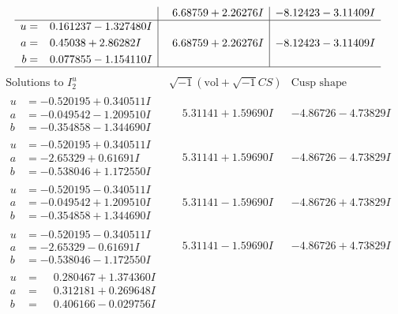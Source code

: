 \documentclass[1p]{elsarticle_modified}
\theoremstyle{definition}
\newcommand{\I}{\sqrt{-1}}
\begin{document}
$$\begin{array}{c|c|c}
 & \phantom{-}6.68759 + 2.26276 I & -8.12423 - 3.11409 I \\ \hline\begin{aligned}
u &= \phantom{-}0.161237 - 1.327480 I \\
a &= \phantom{-}0.45038 + 2.86282 I \\
b &= \phantom{-}0.077855 - 1.154110 I\end{aligned}
 & \phantom{-}6.68759 + 2.26276 I & -8.12423 - 3.11409 I\\
 \hline 
 \end{array}$$\newpage$$\begin{array}{c|c|c}  
\text{Solutions to }I^u_{2}& \I (\text{vol} + \sqrt{-1}CS) & \text{Cusp shape}\\
 \hline 
\begin{aligned}
u &= -0.520195 + 0.340511 I \\
a &= -0.049542 - 1.209510 I \\
b &= -0.354858 - 1.344690 I\end{aligned}
 & \phantom{-}5.31141 + 1.59690 I & -4.86726 - 4.73829 I \\ \hline\begin{aligned}
u &= -0.520195 + 0.340511 I \\
a &= -2.65329 + 0.61691 I \\
b &= -0.538046 + 1.172550 I\end{aligned}
 & \phantom{-}5.31141 + 1.59690 I & -4.86726 - 4.73829 I \\ \hline\begin{aligned}
u &= -0.520195 - 0.340511 I \\
a &= -0.049542 + 1.209510 I \\
b &= -0.354858 + 1.344690 I\end{aligned}
 & \phantom{-}5.31141 - 1.59690 I & -4.86726 + 4.73829 I \\ \hline\begin{aligned}
u &= -0.520195 - 0.340511 I \\
a &= -2.65329 - 0.61691 I \\
b &= -0.538046 - 1.172550 I\end{aligned}
 & \phantom{-}5.31141 - 1.59690 I & -4.86726 + 4.73829 I \\ \hline\begin{aligned}
u &= \phantom{-}0.280467 + 1.374360 I \\
a &= \phantom{-}0.312181 + 0.269648 I \\
b &= \phantom{-}0.406166 - 0.029756 I\end{aligned}

\end{array}$$
\end{document}
